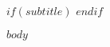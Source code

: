 \documentclass[10pt,letterpaper,twoside,]{article}
\begin{document}
\thispagestyle{empty}
\singlespacing

\vspace*{\fill}

$if(subtitle)$
$endif$

\vspace*{\fill}

$body$
\end{document}
